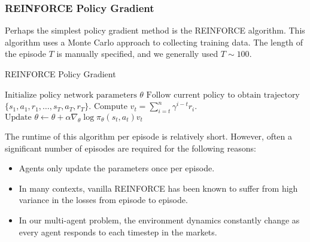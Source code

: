 \documentclass[twoside,twocolumn]{article}
\begin{document}
\subsubsection{REINFORCE Policy Gradient}
Perhaps the simplest policy gradient method is the REINFORCE algorithm. This algorithm uses a Monte Carlo approach to collecting training data. The length of the episode $T$ is manually specified, and we generally used $T \sim 100$.
\begin{algorithm}
\caption{REINFORCE Policy Gradient \cite{reinforce-lectures}}\label{euclid}
\begin{algorithmic}[1]
\State $\text{Initialize policy network parameters }\theta$
\State $\text{Follow current policy to obtain trajectory }$\newline\phantom{======}$\{s_1, a_1, r_1, \ldots, s_T, a_T, r_T\}$.
\State $\text{Compute }v_t = \sum_{i = t}^n \gamma^{i- t} r_i$.
\State $\text{Update } \theta \leftarrow \theta + \alpha \nabla_{\theta}\log\pi_{\theta} (s_t, a_t) v_t$
\EndFor
\EndFor
\State \Return {$\theta$}
\EndProcedure
\end{algorithmic}
\end{algorithm}
The runtime of this algorithm per episode is relatively short. However, often a significant number of episodes are required for the following reasons:
\begin{itemize}
  \item Agents only update the parameters once per episode.
  \item In many contexts, vanilla REINFORCE has been known to suffer from high variance in the losses from episode to episode.\cite{reinforce-lectures}
  \item In our multi-agent problem, the environment dynamics constantly change as every agent responds to each timestep in the markets.
\end{itemize}
\end{document}
